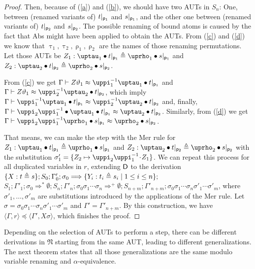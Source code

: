 \documentclass[11pt,a4paper]{amsart}
\theoremstyle{definition}
\newcommand{\Lra}{\Longrightarrow}
\newcommand{\frN}{\mathfrak N}
\newcommand{\permap}{{\mkern 1mu\cdot \mkern 1mu}}
\newcommand{\permef}{\bullet}
\newcommand\pos{{\sf p}}
\newcommand\ppi{\uppi}
\newcommand\prho{\uprho}
\newcommand\ptau{\uptau}
\newcommand{\np}[2]{\langle #1, \allowbreak #2\rangle}
\begin{document}
\begin{proof}
Then, because of (\ref{a}) and (\ref{b}), we should have two AUTs in $S_n$: One, between (renamed variants of) $t|_{\pos_1}$ and $s|_{\pos_1}$, and the other one between (renamed variants of) $t|_{\pos_2}$ and $s|_{\pos_2}$.  The possible renaming of bound atoms is caused by the fact that \textsf{Abs} might have been applied to obtain the AUTs. From (\ref{c}) and (\ref{d}) we know that $\ptau_1,\ptau_2,\prho_1,\prho_2$ are the names of those renaming permutations. Let those AUTs be $Z_1: \ptau_1\permef t|_{\pos_1} \triangleq \prho_1\permef s|_{\pos_1}$ and $Z_2 : \ptau_2\permef t|_{\pos_2} \triangleq \prho_2\permef s|_{\pos_2}$.

From (\ref{c}) we get $\Gamma \vdash  Z\vartheta_1 \approx \ppi_1^{-1} \ptau_1\permef t|_{\pos_1}$ and $\Gamma \vdash Z\vartheta_1 \approx \ppi_2^{-1} \ptau_2\permef t|_{\pos_2}$, which imply $\Gamma \vdash  \ppi_1^{-1} \ptau_1\permef t|_{\pos_1} \approx \ppi_2^{-1} \ptau_2\permef t|_{\pos_2} $ and, finally, $\Gamma \vdash \ppi_2 \ppi_1^{-1}\permef \ptau_1\permef t|_{\pos_1} \approx \ptau_2\permef t|_{\pos_2} $. Similarly, from (\ref{d}) we get $\Gamma \vdash  \ppi_2 \ppi_1^{-1} \prho_1\permef s|_{\pos_1} \approx \prho_2\permef s|_{\pos_2} $.

That means, we can make the step with the \textsf{Mer} rule for $Z_1: \ptau_1\permef t|_{\pos_1} \triangleq \prho_1\permef s|_{\pos_1}$ and $Z_2 : \ptau_2\permef t|_{\pos_2} \triangleq \prho_2\permef s|_{\pos_2}$ with the substitution $\sigma'_1=\{Z_2\mapsto \ppi_2 \ppi_1^{-1}\permap Z_1\}$.
%
We can repeat this process for all duplicated vari\-ables in $r$, extending $\sf D$ to the derivation
$\{X :t \triangleq \penalty10000 s \};S_0;\allowbreak \Gamma'_0; \sigma_0\Lra \{Y_i :t_i \triangleq s_i \mid 1\le i \le n\};$ $S_1;\Gamma'_1;\sigma_0 \Lra^* \emptyset; S_n;\Gamma'_n;
\sigma_0\sigma_1\cdots\sigma_n \Lra^+ \emptyset; S_{n+m}; \Gamma'_{n+m}; \allowbreak\sigma_0\sigma_1\cdots\sigma_n\sigma'_1\cdots\sigma'_m$, where $\sigma'_1,\ldots, \sigma'_m$ are substitutions introduced by the applications of the \textsf{Mer} rule. Let $\sigma =\sigma_0\sigma_1\cdots\sigma_n\sigma'_1\cdots\sigma'_m $ and $\Gamma'=\Gamma'_{n+m}$. By this construction, we have $\np{\Gamma}{r} \preceq \np{\Gamma'}{X\sigma}$, which finishes the proof.

\end{proof}


Depending on the selection of AUTs to perform a step, there can be different derivations in $\frN$ starting from the same AUT, leading to different generalizations. The next theorem states that all those generalizations are the same modulo variable renaming and $\alpha$-equivalence.
\end{document}
